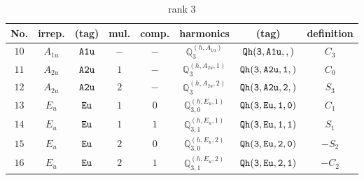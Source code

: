 \documentclass[fleqn,8pt]{jsarticle}
\begin{document}
\begin{table}[ht!]
\begin{center}
\caption{rank 3}
\renewcommand{\arraystretch}{1.3}
\begin{tabular}{cccccccc} \hline \hline
No. & irrep. & (tag) & mul. & comp. & harmonics & (tag) & definition \\ \hline
$ 10 $ & $ A_{1u} $ & $ {\tt A1u} $ & $ - $ & $ - $ & $ \mathbb{Q}_{3}^{(h,A_{1u})} $ & $ {\tt Qh(3,A1u,,)} $ & $ C_{3} $ \\
$ 11 $ & $ A_{2u} $ & $ {\tt A2u} $ & $ 1 $ & $ - $ & $ \mathbb{Q}_{3}^{(h,A_{2u},1)} $ & $ {\tt Qh(3,A2u,1,)} $ & $ C_{0} $ \\
$ 12 $ & $ A_{2u} $ & $ {\tt A2u} $ & $ 2 $ & $ - $ & $ \mathbb{Q}_{3}^{(h,A_{2u},2)} $ & $ {\tt Qh(3,A2u,2,)} $ & $ S_{3} $ \\
$ 13 $ & $ E_{u} $ & $ {\tt Eu} $ & $ 1 $ & $ 0 $ & $ \mathbb{Q}_{3,0}^{(h,E_{u},1)} $ & $ {\tt Qh(3,Eu,1,0)} $ & $ C_{1} $ \\
$ 14 $ & $ E_{u} $ & $ {\tt Eu} $ & $ 1 $ & $ 1 $ & $ \mathbb{Q}_{3,1}^{(h,E_{u},1)} $ & $ {\tt Qh(3,Eu,1,1)} $ & $ S_{1} $ \\
$ 15 $ & $ E_{u} $ & $ {\tt Eu} $ & $ 2 $ & $ 0 $ & $ \mathbb{Q}_{3,0}^{(h,E_{u},2)} $ & $ {\tt Qh(3,Eu,2,0)} $ & $ - S_{2} $ \\
$ 16 $ & $ E_{u} $ & $ {\tt Eu} $ & $ 2 $ & $ 1 $ & $ \mathbb{Q}_{3,1}^{(h,E_{u},2)} $ & $ {\tt Qh(3,Eu,2,1)} $ & $ - C_{2} $ \\
 \hline \hline
\end{tabular}
\end{center}
\end{table}
\end{document}
